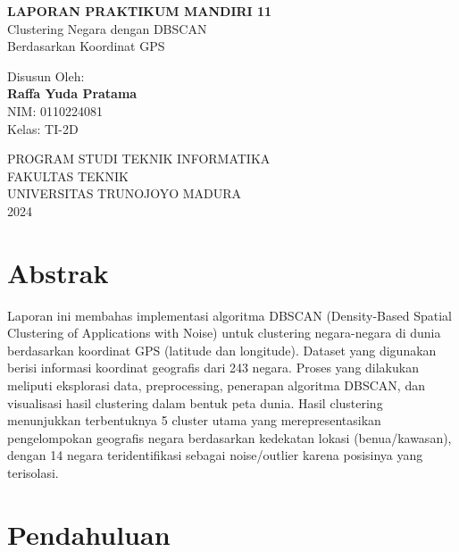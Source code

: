 \documentclass[12pt,a4paper]{article}
\begin{document}
\begin{titlepage}
    \centering
    \vspace*{2cm}
    
    {\LARGE\bfseries LAPORAN PRAKTIKUM MANDIRI 11\\}
    \vspace{0.5cm}
    {\Large Clustering Negara dengan DBSCAN\\}
    {\Large Berdasarkan Koordinat GPS\\}
    \vspace{2cm}
    
    {\large Disusun Oleh:\\}
    \vspace{0.5cm}
    {\Large\bfseries Raffa Yuda Pratama\\}
    {\large NIM: 0110224081\\}
    {\large Kelas: TI-2D\\}
    \vspace{3cm}
    
    {\large PROGRAM STUDI TEKNIK INFORMATIKA\\}
    {\large FAKULTAS TEKNIK\\}
    {\large UNIVERSITAS TRUNOJOYO MADURA\\}
    {\large 2024\\}
\end{titlepage}

\section*{Abstrak}
Laporan ini membahas implementasi algoritma DBSCAN (Density-Based Spatial Clustering of Applications with Noise) untuk clustering negara-negara di dunia berdasarkan koordinat GPS (latitude dan longitude). Dataset yang digunakan berisi informasi koordinat geografis dari 243 negara. Proses yang dilakukan meliputi eksplorasi data, preprocessing, penerapan algoritma DBSCAN, dan visualisasi hasil clustering dalam bentuk peta dunia. Hasil clustering menunjukkan terbentuknya 5 cluster utama yang merepresentasikan pengelompokan geografis negara berdasarkan kedekatan lokasi (benua/kawasan), dengan 14 negara teridentifikasi sebagai noise/outlier karena posisinya yang terisolasi.

\newpage
\tableofcontents
\newpage

\section{Pendahuluan}
\end{document}
